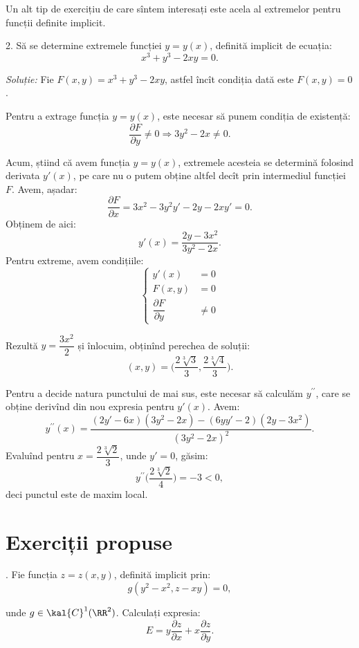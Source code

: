 Un alt tip de exercițiu de care sîntem interesați este acela al extremelor pentru
funcții definite implicit.

2. Să se determine extremele funcției $ y = y(x) $, definită implicit de ecuația:
\[
  x^3 + y^3 - 2xy = 0.
\]

\emph{Soluție:} Fie $ F(x, y) = x^3 + y^3 - 2xy $, astfel încît condiția dată
este $ F(x, y) = 0 $.

Pentru a extrage funcția $ y = y(x) $, este necesar să punem condiția
de existență:
\[
  \dfrac{\partial F}{\partial y} \neq 0 \Rightarrow 3y^2 - 2x \neq 0.
\]

Acum, știind că avem funcția $ y = y(x) $, extremele acesteia se determină
folosind derivata $ y'(x) $, pe care nu o putem obține altfel decît prin
intermediul funcției $ F $. Avem, așadar:
\[
  \frac{\partial F}{\partial x} = 3x^2 - 3y^2 y' - 2y - 2x y' = 0.
\]
Obținem de aici:
\[
  y'(x) = \frac{2y - 3x^2}{3y^2 - 2x}.
\]
Pentru extreme, avem condițiile:
\[
  \begin{cases}
    y'(x) &= 0 \\
    F(x, y) &= 0 \\
    \dfrac{\partial F}{\partial y} &\neq 0
  \end{cases}
\]

Rezultă $ y = \dfrac{3x^2}{2} $ și înlocuim, obținînd perechea de soluții:
\[
  (x, y) = \Big( \dfrac{2\sqrt[3]{3}}{3}, \dfrac{2\sqrt[3]{4}}{3} \Big).
\]

Pentru a decide natura punctului de mai sus, este necesar să calculăm
$ y^{\prime\prime} $, care se obține derivînd din nou expresia pentru $ y'(x) $.
Avem:
\[
  y^{\prime\prime}(x) = \frac{(2y' - 6x)(3y^2 - 2x) - (6yy' - 2)(2y - 3x^2)}{(3y^2 - 2x)^2}.
\]
Evaluînd pentru $ x = \dfrac{2 \sqrt[3]{2}}{3} $, unde $ y' = 0 $, găsim:
\[
  y^{\prime\prime}\Big( \dfrac{2 \sqrt[3]{2}}{4} \Big) = -3 < 0,
\]
deci punctul este de maxim local.


\section{Exerciții propuse}

\indent{}. Fie funcția $ z = z(x, y) $, definită implicit prin:
\[
  g(y^2 - x^2, z - xy) = 0,
\]

unde $ g \in \kal{C}^1(\RR^2) $. Calculați expresia:
\[
  E = y \dfrac{\partial z}{\partial x} + x \dfrac{\partial z}{\partial y}.
\]

